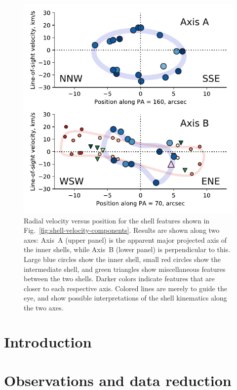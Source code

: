 \documentclass[useAMS, usenatbib, a4paper]{mnras}
\begin{document}
\begin{figure}
  \centering
  \includegraphics[width=\linewidth]{turtle-shell-velocity-axes-annotated}
  \caption{
    Radial velocity versus position
    for the shell features shown in Fig.~\ref{fig:shell-velocity-components}.
    Results are shown along two axes:
    Axis~A (upper panel) is the apparent major projected axis of the inner shells,
    while Axis~B (lower panel) is perpendicular to this.
    Large blue circles show the inner shell,
    small red circles show the intermediate shell,
    and green triangles show miscellaneous features between the two shells.
    Darker colors indicate features that are closer to each respective axis.
    Colored lines are merely to guide the eye,
    and show possible interpretations of the shell kinematics along the two axes.
  }
  \label{fig:shell-velocity-axes}
\end{figure}


\section{Introduction}
\label{sec:introduction}

\section{Observations and data reduction}
\label{sec:observ-data-reduct}
\end{document}
